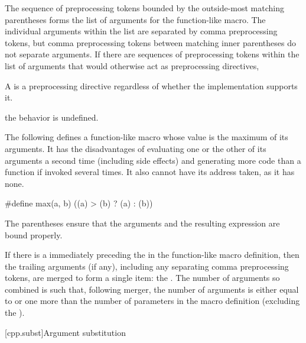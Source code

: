 \pnum
{}%
The sequence of preprocessing tokens
bounded by the outside-most matching parentheses
forms the list of arguments for the function-like macro.
The individual arguments within the list
are separated by comma preprocessing tokens,
but comma preprocessing tokens between matching
inner parentheses do not separate arguments.
If there are sequences of preprocessing tokens within the list of
arguments that would otherwise act as preprocessing directives,
\begin{footnote}
A  is a preprocessing directive regardless of whether the implementation supports it.
\end{footnote}
the behavior is undefined.

\pnum
\begin{example}
The following defines a function-like
macro whose value is the maximum of its arguments.
It has the disadvantages of evaluating one or the other of its arguments
a second time
(including
%
side effects)
and generating more code than a function if invoked several times.
It also cannot have its address taken,
as it has none.

\begin{codeblock}
#define max(a, b) ((a) > (b) ? (a) : (b))
\end{codeblock}

The parentheses ensure that the arguments and
the resulting expression are bound properly.
\end{example}

\pnum
{}%
If there is a  immediately preceding the \tcode{)} in the
function-like macro
definition, then the trailing arguments (if any), including any separating comma preprocessing
tokens, are merged to form a single item: the . The number of
arguments so combined is such that, following merger, the number of arguments is
either equal to or
one more than the number of parameters in the macro definition (excluding the
).

[cpp.subst]{Argument substitution}%
%
%

%
\begin{bnf}
\br
      \terminal{)}
\end{bnf}

